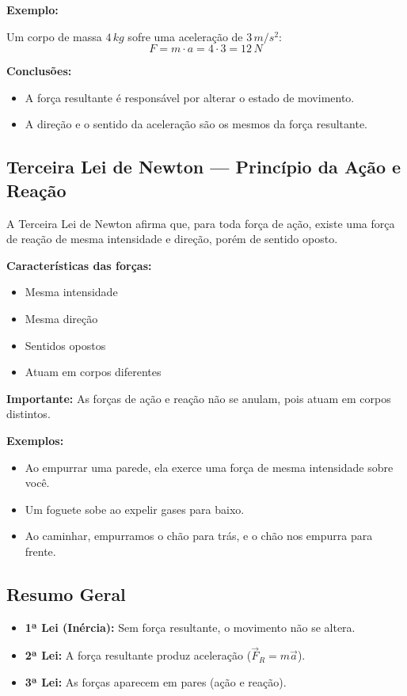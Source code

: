 \documentclass[a4paper,12pt]{article}
\begin{document}
\textbf{Exemplo:}

Um corpo de massa $4\,kg$ sofre uma aceleração de $3\,m/s^2$:
\[
F = m \cdot a = 4 \cdot 3 = 12\,N
\]

\textbf{Conclusões:}
\begin{itemize}
    \item A força resultante é responsável por alterar o estado de movimento.
    \item A direção e o sentido da aceleração são os mesmos da força resultante.
\end{itemize}

\subsection{Terceira Lei de Newton — Princípio da Ação e Reação}

A Terceira Lei de Newton afirma que, para toda força de ação, existe uma força de reação de mesma intensidade e direção, porém de sentido oposto.

\textbf{Características das forças:}
\begin{itemize}
    \item Mesma intensidade
    \item Mesma direção
    \item Sentidos opostos
    \item Atuam em corpos diferentes
\end{itemize}

\textbf{Importante:} As forças de ação e reação não se anulam, pois atuam em corpos distintos.

\textbf{Exemplos:}
\begin{itemize}
    \item Ao empurrar uma parede, ela exerce uma força de mesma intensidade sobre você.
    \item Um foguete sobe ao expelir gases para baixo.
    \item Ao caminhar, empurramos o chão para trás, e o chão nos empurra para frente.
\end{itemize}

\subsection{Resumo Geral}

\begin{itemize}
    \item \textbf{1ª Lei (Inércia):} Sem força resultante, o movimento não se altera.
    \item \textbf{2ª Lei:} A força resultante produz aceleração ($\vec{F}_R = m\vec{a}$).
    \item \textbf{3ª Lei:} As forças aparecem em pares (ação e reação).
\end{itemize}
\end{document}
